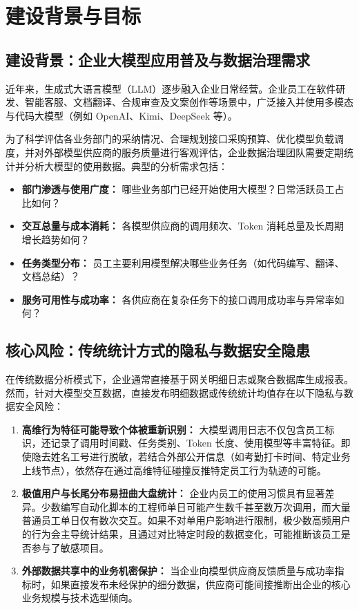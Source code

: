 \section{建设背景与目标}
\label{sec:background_goals}

\subsection{建设背景：企业大模型应用普及与数据治理需求}
近年来，生成式大语言模型（LLM）逐步融入企业日常经营。企业员工在软件研发、智能客服、文档翻译、合规审查及文案创作等场景中，广泛接入并使用多模态与代码大模型（例如 OpenAI、Kimi、DeepSeek 等）。

为了科学评估各业务部门的采纳情况、合理规划接口采购预算、优化模型负载调度，并对外部模型供应商的服务质量进行客观评估，企业数据治理团队需要定期统计并分析大模型的使用数据。典型的分析需求包括：
\begin{itemize}[leftmargin=2em]
  \item \textbf{部门渗透与使用广度：} 哪些业务部门已经开始使用大模型？日常活跃员工占比如何？
  \item \textbf{交互总量与成本消耗：} 各模型供应商的调用频次、Token 消耗总量及长周期增长趋势如何？
  \item \textbf{任务类型分布：} 员工主要利用模型解决哪些业务任务（如代码编写、翻译、文档总结）？
  \item \textbf{服务可用性与成功率：} 各供应商在复杂任务下的接口调用成功率与异常率如何？
\end{itemize}

\subsection{核心风险：传统统计方式的隐私与数据安全隐患}
在传统数据分析模式下，企业通常直接基于网关明细日志或聚合数据库生成报表。然而，针对大模型交互数据，直接发布明细数据或传统统计均值存在以下隐私与数据安全风险：
\begin{enumerate}[label=\textbf{\arabic*.}, leftmargin=2em]
  \item \textbf{高维行为特征可能导致个体被重新识别：} 大模型调用日志不仅包含员工标识，还记录了调用时间戳、任务类别、Token 长度、使用模型等丰富特征。即使隐去姓名工号进行脱敏，若结合外部公开信息（如考勤打卡时间、特定业务上线节点），依然存在通过高维特征碰撞反推特定员工行为轨迹的可能。
  \item \textbf{极值用户与长尾分布易扭曲大盘统计：} 企业内员工的使用习惯具有显著差异。少数编写自动化脚本的工程师单日可能产生数千甚至数万次调用，而大量普通员工单日仅有数次交互。如果不对单用户影响进行限制，极少数高频用户的行为会主导统计结果，且通过对比特定时段的数据变化，可能推断该员工是否参与了敏感项目。
  \item \textbf{外部数据共享中的业务机密保护：} 当企业向模型供应商反馈质量与成功率指标时，如果直接发布未经保护的细分数据，供应商可能间接推断出企业的核心业务规模与技术选型倾向。
\end{enumerate}

